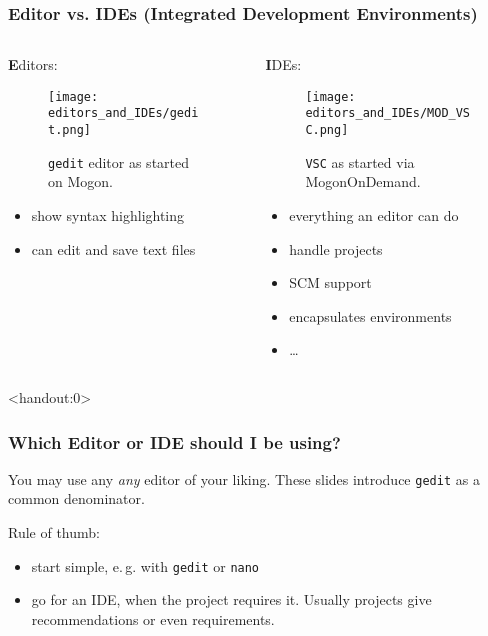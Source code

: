 \begin{frame}
  \frametitle{Editor vs. IDEs (Integrated Development Environments)}
  \footnotesize
  \begin{columns}[t]
  	\begin{column}{.5\textwidth}
  	  {\normalsize\textbf Editors:}
  	  \begin{figure}[t]
  		 \texttt{[image: editors\_and\_IDEs/gedit.png]}
  		 \caption*{\texttt{gedit} editor as started on Mogon.}
  	  \end{figure}
      \vfill
  	  \begin{itemize}
  	  	\item show syntax highlighting
  	  	\item can edit and save text files
  	  \end{itemize}  
  	\end{column}
  	\begin{column}{.5\textwidth}
  	  {\normalsize\textbf IDEs:}
  	  \begin{figure}[t]
  	  	\texttt{[image: editors\_and\_IDEs/MOD\_VSC.png]}
  		\caption*{\texttt{VSC} as started via MogonOnDemand.}
  	  \end{figure}
      \vfill
      \begin{itemize}
         \item everything an editor can do
         \item handle projects
         \item SCM support
         \item encapsulates environments
         \item \ldots
      \end{itemize}  
  	\end{column}
  \end{columns}
\end{frame}

\begin{frame}<handout:0>
  \frametitle{Which Editor or IDE should I be using?}
  \begin{hint}
     You may use any \emph{any} editor of your liking. These slides introduce \texttt{gedit} as a common denominator.
  \end{hint}
  Rule of thumb:
  \begin{itemize}[<+->]
  	\item start simple, e.\,g. with \texttt{gedit} or \texttt{nano}
  	\item go for an IDE, when the project requires it. Usually projects give recommendations or even requirements.
  \end{itemize}
\end{frame} 


